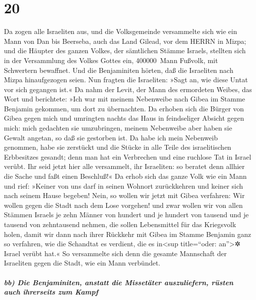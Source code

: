 \hypertarget{section-19}{%
\section{20}\label{section-19}}

Da zogen alle Israeliten aus, und die Volksgemeinde
versammelte sich wie ein Mann von Dan bis Beerseba, auch das Land
Gilead, vor dem HERRN in Mizpa; und die Häupter des ganzen
Volkes, der sämtlichen Stämme Israels, stellten sich in der Versammlung
des Volkes Gottes ein, 400000~Mann Fußvolk, mit Schwertern bewaffnet.
Und die Benjaminiten hörten, daß die Israeliten nach Mizpa
hinaufgezogen seien. Nun fragten die Israeliten: »Sagt an, wie diese
Untat vor sich gegangen ist.« Da nahm der Levit, der Mann
des ermordeten Weibes, das Wort und berichtete: »Ich war mit meinem
Nebenweibe nach Gibea im Stamme Benjamin gekommen, um dort zu
übernachten. Da erhoben sich die Bürger von Gibea gegen
mich und umringten nachts das Haus in feindseliger Absicht gegen mich:
mich gedachten sie umzubringen, meinem Nebenweibe aber haben sie Gewalt
angetan, so daß sie gestorben ist. Da habe ich mein
Nebenweib genommen, habe sie zerstückt und die Stücke in alle Teile des
israelitischen Erbbesitzes gesandt; denn man hat ein Verbrechen und eine
ruchlose Tat in Israel verübt. Ihr seid jetzt hier alle
versammelt, ihr Israeliten: so beratet denn allhier die Sache und faßt
einen Beschluß!« Da erhob sich das ganze Volk wie ein Mann
und rief: »Keiner von uns darf in seinen Wohnort zurückkehren und keiner
sich nach seinem Hause begeben! Nein, so wollen wir jetzt
mit Gibea verfahren: Wir wollen gegen die Stadt nach dem Lose vorgehen!
und zwar wollen wir von allen Stämmen Israels je zehn
Männer von hundert und je hundert von tausend und je tausend von
zehntausend nehmen, die sollen Lebensmittel für das Kriegsvolk holen,
damit wir dann nach ihrer Rückkehr mit Gibea im Stamme Benjamin ganz so
verfahren, wie die Schandtat es verdient, die es in\textless sup
title=``oder: an''\textgreater✲ Israel verübt hat.« So
versammelte sich denn die gesamte Mannschaft der Israeliten gegen die
Stadt, wie ein Mann verbündet.

\hypertarget{bb-die-benjaminiten-anstatt-die-missetuxe4ter-auszuliefern-ruxfcsten-auch-ihrerseits-zum-kampf}{%
\subparagraph{bb) Die Benjaminiten, anstatt die Missetäter auszuliefern,
rüsten auch ihrerseits zum
Kampf}\label{bb-die-benjaminiten-anstatt-die-missetuxe4ter-auszuliefern-ruxfcsten-auch-ihrerseits-zum-kampf}}

